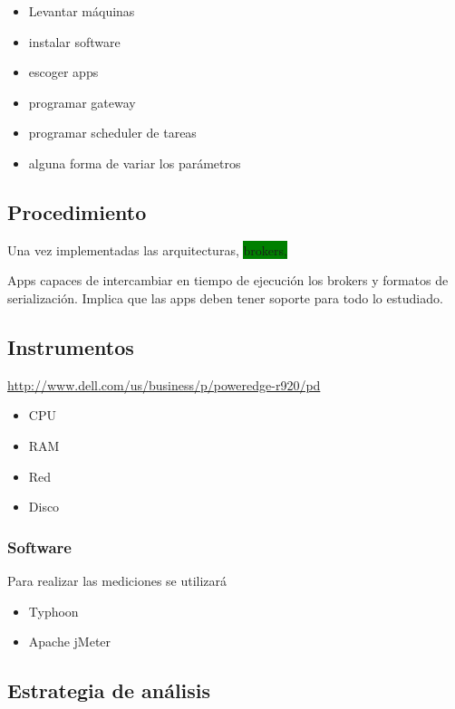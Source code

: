 \begin{itemize}
  \item Levantar máquinas
  \item instalar software
  \item escoger apps
  \item programar gateway
  \item programar scheduler de tareas
  \item alguna forma de variar los parámetros
\end{itemize}

\subsection{Procedimiento}
Una vez implementadas las arquitecturas, \colorbox{green}{brokers, }

Apps capaces de intercambiar en tiempo de ejecución los brokers y formatos de serialización.
Implica que las apps deben tener soporte para todo lo estudiado.

\subsection{Instrumentos}

\url{http://www.dell.com/us/business/p/poweredge-r920/pd}
\begin{itemize}
  \item CPU
  \item RAM
  \item Red
  \item Disco
\end{itemize}

\subsubsection{Software}

Para realizar las mediciones se utilizará

\begin{itemize}
  \item Typhoon
  \item Apache jMeter
\end{itemize}

\subsection{Estrategia de análisis}

\subsection{}

